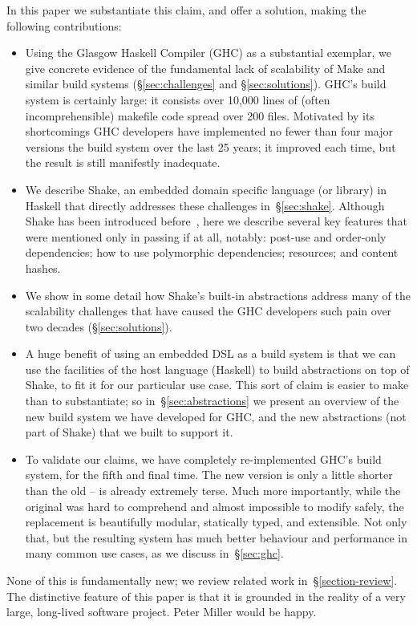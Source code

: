 In this paper we substantiate this claim, and offer a solution,
making the following contributions:
\begin{itemize}
\item Using the Glasgow Haskell Compiler (GHC) as a substantial exemplar,
we give concrete evidence of the fundamental lack of scalability of
Make and similar build systems (\S\ref{sec:challenges} and
\S\ref{sec:solutions}).  GHC's build system is certainly large: it
consists over 10,000 lines of (often incomprehensible) makefile code
spread over 200 files.  Motivated by its shortcomings GHC developers have
implemented no fewer than four major versions the build system over the
last 25 years; it improved each time, but the result is still manifestly inadequate.

\item We describe Shake, an embedded domain specific language (or library)
in Haskell that directly addresses these challenges
in~\S\ref{sec:shake}.
Although Shake has been introduced before~\cite{shake}, here we describe
several key features that were mentioned only in passing if at all, notably:
post-use and order-only dependencies; how to use polymorphic dependencies;
resources; and content hashes.

\item We show in some detail how Shake's built-in abstractions address
many of the scalability challenges that have caused the GHC developers such pain over
two decades (\S\ref{sec:solutions}).

\item A huge benefit of using an embedded DSL as a build system is that
we can use the facilities of the host language (Haskell) to build
abstractions on top of Shake, to fit it for our particular use case.
This sort of claim is easier to make than to substantiate; so
in~\S\ref{sec:abstractions} we present an overview of the new build system we have
developed for GHC, and the new abstractions (not part of Shake) that we built
to support it.

\item To validate our claims, we have completely re-implemented GHC's
build system, for the fifth and final time.  The new version is
only a little shorter than the old -- \make{} is already extremely terse.
Much more importantly, while the original was hard to comprehend and
almost impossible to modify safely, the replacement is beautifully
modular, statically typed, and extensible.  Not only that, but the
resulting system has much better behaviour and performance in many
common use cases, as we discuss in~\S\ref{sec:ghc}.
\end{itemize}
None of this is fundamentally new; we review related work
in~\S\ref{section-review}.
The distinctive feature of this paper is that it is grounded in the reality
of a very large, long-lived software project.  Peter Miller would be happy.

